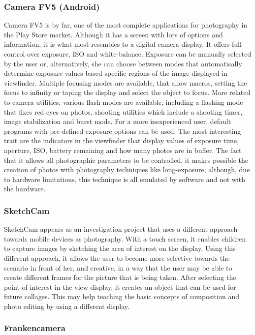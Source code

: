 \subsubsection{Camera FV5 (Android)}

 Camera FV5 is by far, one of the most complete applications for photography in the Play Store market. Although it has a screen with lots of options and information, it is what most resembles to a digital camera display. It offers full control over exposure, ISO and white-balance. Exposure can be manually selected by the user or, alternatively, she can choose between modes that automatically determine exposure values based specific regions of the image displayed in viewfinder. 
Multiple focusing modes are available, that allow macros, setting the focus to infinity or taping the display and select the object to focus.
More related to camera utilities, various flash modes are available, including a flashing mode that fixes red eyes on photos, shooting utilities which include a shooting timer, image stabilization and burst mode.
For a more inexperienced user, default programs with pre-defined exposure options can be used.
The most interesting trait are the indicators in the viewfinder that display values of exposure time, aperture, ISO, battery remaining and how many photos are in buffer.
The fact that it allows all photographic parameters to be controlled, it makes possible the creation of photos with photography techniques like long-exposure, although, due to hardware limitations, this technique is all emulated by software and not with the hardware.

\subsubsection{SketchCam}

 SketchCam appears as an investigation project that uses a different approach towards mobile devices as photography. With a touch screen, it enables children to capture images by sketching the area of interest on the display. 
Using this different approach, it allows the user to become more selective towards the scenario in front of her, and creative, in a way that the user may be able to create different frames for the picture that is being taken.  After selecting the point of interest in the view display, it creates an object that can be used for future collages. This may help teaching the basic concepts of composition and photo editing by using a different display.

\subsubsection{Frankencamera}

